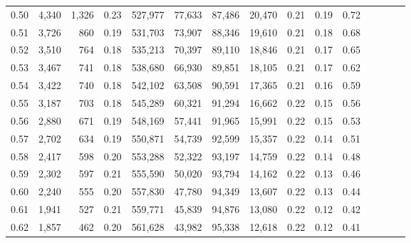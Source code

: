 \begin{tabular}{rrrcrrrrrrrrrrr}
0.50 &   4,340 &   1,326 &                                       0.23 &  527,977 &   77,633 &   87,486 &   20,470 &  0.21 &  0.19 &                         0.72 \\
0.51 &   3,726 &     860 &                                       0.19 &  531,703 &   73,907 &   88,346 &   19,610 &  0.21 &  0.18 &                         0.68 \\
0.52 &   3,510 &     764 &                                       0.18 &  535,213 &   70,397 &   89,110 &   18,846 &  0.21 &  0.17 &                         0.65 \\
0.53 &   3,467 &     741 &                                       0.18 &  538,680 &   66,930 &   89,851 &   18,105 &  0.21 &  0.17 &                         0.62 \\
0.54 &   3,422 &     740 &                                       0.18 &  542,102 &   63,508 &   90,591 &   17,365 &  0.21 &  0.16 &                         0.59 \\
0.55 &   3,187 &     703 &                                       0.18 &  545,289 &   60,321 &   91,294 &   16,662 &  0.22 &  0.15 &                         0.56 \\
0.56 &   2,880 &     671 &                                       0.19 &  548,169 &   57,441 &   91,965 &   15,991 &  0.22 &  0.15 &                         0.53 \\
0.57 &   2,702 &     634 &                                       0.19 &  550,871 &   54,739 &   92,599 &   15,357 &  0.22 &  0.14 &                         0.51 \\
0.58 &   2,417 &     598 &                                       0.20 &  553,288 &   52,322 &   93,197 &   14,759 &  0.22 &  0.14 &                         0.48 \\
0.59 &   2,302 &     597 &                                       0.21 &  555,590 &   50,020 &   93,794 &   14,162 &  0.22 &  0.13 &                         0.46 \\
0.60 &   2,240 &     555 &                                       0.20 &  557,830 &   47,780 &   94,349 &   13,607 &  0.22 &  0.13 &                         0.44 \\
0.61 &   1,941 &     527 &                                       0.21 &  559,771 &   45,839 &   94,876 &   13,080 &  0.22 &  0.12 &                         0.42 \\
0.62 &   1,857 &     462 &                                       0.20 &  561,628 &   43,982 &   95,338 &   12,618 &  0.22 &  0.12 &                         0.41 \\

\end{tabular}
